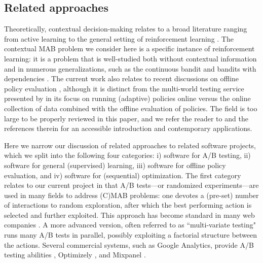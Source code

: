 \documentclass[nojss]{jss}
\begin{document}
\subsection{Related approaches}

Theoretically, contextual decision-making relates to a broad literature ranging from active learning  \citep[e.g.,][]{beygelzimer2010agnostic, hanneke2014theory} to the general setting of reinforcement learning \citep{sutton1998introduction, szepesvari2010algorithms}. The contextual MAB problem \citep{Dudik2011a, Li2010b,agarwal2014taming} we consider here is a specific instance of reinforcement learning: it is a problem that is well-studied both without contextual information \citep{berry1985bandit} and in numerous generalizations, such as the continuous bandit \citep{mandelbaum1987continuous} and bandits with dependencies \citep{pandey2007multi}. The current work also relates to recent discussions on offline policy evaluation \citep{dudik2012sample, langford2011doubly}, although it is distinct from the multi-world testing service presented by \citet{agarwal2016making} in its focus on running (adaptive) policies online versus the online collection of data combined with the offline evaluation of policies. The field is too large to be properly reviewed in this paper, and we refer the reader to \citet{schwartz2017customer} and the references therein for an accessible introduction and contemporary applications.

Here we narrow our discussion of related approaches to related software projects, which we split into the following four categories: i) software for A/B testing, ii) software for general (supervised) learning, iii) software for offline policy evaluation, and iv) software for (sequential) optimization. The first category relates to our current project in that A/B tests---or randomized experiments---are used in many fields to address (C)MAB problems: one devotes a (pre-set) number of interactions to random exploration, after which the best performing action is selected and further exploited. This approach has become standard in many web companies \citep{jiang2016framework}. A more advanced version, often referred to as ``multi-variate testing" runs many A/B tests in parallel, possibly exploiting a factorial structure between the actions. Several commercial systems, such as Google Analytics, provide A/B testing abilities \citep{googleanalytics},  Optimizely \citep{optimizely}, and Mixpanel \citep{mixpanel}.
\end{document}
